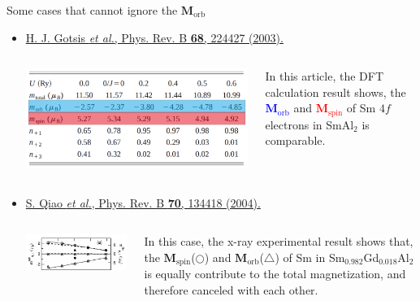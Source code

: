 \documentclass{beamer}
\newcommand{\purple}{\textcolor{purple}}
\begin{document}
    \begin{frame}{Some cases that cannot ignore the \(\bm{M}_{\text{orb}}\)}
      \begin{itemize}
        \item \purple{\href{https://doi.org/10.1103/PhysRevB.68.224427}{H. J. Gotsis \emph{et al.}, Phys. Rev. B \textbf{68}, 224427 (2003).}}\\
        \begin{columns}
          \begin{column}{0.35\textwidth}
            \includegraphics[width=\textwidth]{figure/SmAl2.png}
          \end{column}
          \begin{column}{0.6\textwidth}\footnotesize
            In this article, the DFT calculation result shows, the \textcolor{blue}{\(\bm{M}_{\text{orb}}\)} and \textcolor{red}{\(\bm{M}_{\text{spin}}\)} of Sm \(4f\) electrons in SmAl\(_2\) is comparable.
          \end{column}
        \end{columns}

        \item \purple{\href{https://doi.org/10.1103/PhysRevB.70.134418}{S. Qiao \emph{et al.}, Phys. Rev. B \textbf{70}, 134418 (2004).}}\\
        \begin{columns}
          \begin{column}{0.35\textwidth}
            \includegraphics[width=\textwidth]{figure/SmGdAl2.png}
          \end{column}
          \begin{column}{0.6\textwidth}\footnotesize
            In this case, the x-ray experimental result shows that, the \(\bm{M}_{\text{spin}}\)(\(\bigcirc\)) and \(\bm{M}_{\text{orb}}\)(\(\triangle\)) of Sm in Sm\(_{0.982}\)Gd\(_{0.018}\)Al\(_2\) is equally contribute to the total magnetization, and therefore canceled with each other.
          \end{column}
        \end{columns}


\end{itemize}
\end{frame}
\end{document}
